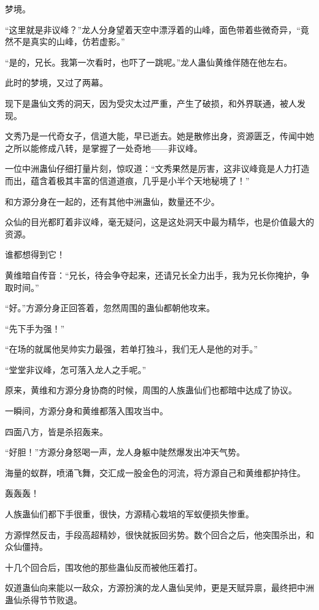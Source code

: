 
\begin{this_body}

梦境。

“这里就是非议峰？”龙人分身望着天空中漂浮着的山峰，面色带着些微奇异，“竟然不是真实的山峰，仿若虚影。”

“是的，兄长。我第一次看时，也吓了一跳呢。”龙人蛊仙黄维伴随在他左右。

此时的梦境，又过了两幕。

现下是蛊仙文秀的洞天，因为受灾太过严重，产生了破损，和外界联通，被人发现。

文秀乃是一代奇女子，信道大能，早已逝去。她是散修出身，资源匮乏，传闻中她之所以能修成八转，是掌握了一处奇地——非议峰。

一位中洲蛊仙仔细打量片刻，惊叹道：“文秀果然是厉害，这非议峰竟是人力打造而出，蕴含着极其丰富的信道道痕，几乎是小半个天地秘境了！”

和方源分身在一起的，还有其他中洲蛊仙，数量还不少。

众仙的目光都盯着非议峰，毫无疑问，这是这处洞天中最为精华，也是价值最大的资源。

谁都想得到它！

黄维暗自传音：“兄长，待会争夺起来，还请兄长全力出手，我为兄长你掩护，争取时间。”

“好。”方源分身正回答着，忽然周围的蛊仙都朝他攻来。

“先下手为强！”

“在场的就属他吴帅实力最强，若单打独斗，我们无人是他的对手。”

“堂堂非议峰，怎可落入龙人之手呢。”

原来，黄维和方源分身协商的时候，周围的人族蛊仙们也都暗中达成了协议。

一瞬间，方源分身和黄维都落入围攻当中。

四面八方，皆是杀招轰来。

“好胆！”方源分身怒喝一声，龙人身躯中陡然爆发出冲天气势。

海量的蚁群，喷涌飞舞，交汇成一股金色的河流，将方源自己和黄维都护持住。

轰轰轰！

人族蛊仙们都下手很重，很快，方源精心栽培的军蚁便损失惨重。

方源悍然反击，手段高超精妙，很快就扳回劣势。数个回合之后，他突围杀出，和众仙僵持。

十几个回合后，围攻他的那些蛊仙反而被他压着打。

奴道蛊仙向来能以一敌众，方源扮演的龙人蛊仙吴帅，更是天赋异禀，最终把中洲蛊仙杀得节节败退。


\end{this_body}
